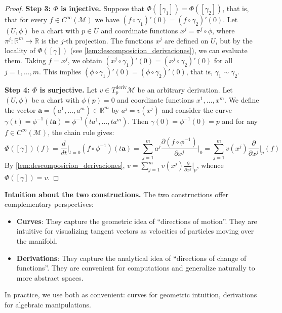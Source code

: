 \begin{proof}
\textbf{Step 3: $\Phi$ is injective.} Suppose that $\Phi([\gamma_1]) = \Phi([\gamma_2])$, that is, that for every $f \in C^\infty(\mathcal{M})$ we have $(f \circ \gamma_1)'(0) = (f \circ \gamma_2)'(0)$. Let $(U, \phi)$ be a chart with $p \in U$ and coordinate functions $x^j = \pi^j \circ \phi$, where $\pi^j: \mathbb{R}^m \to \mathbb{R}$ is the $j$-th projection. The functions $x^j$ are defined on $U$, but by the locality of $\Phi([\gamma])$ (see \autoref{lem:descomposicion_derivaciones}), we can evaluate them. Taking $f = x^j$, we obtain $(x^j \circ \gamma_1)'(0) = (x^j \circ \gamma_2)'(0)$ for all $j = 1, \ldots, m$. This implies $(\phi \circ \gamma_1)'(0) = (\phi \circ \gamma_2)'(0)$, that is, $\gamma_1 \sim \gamma_2$.

\textbf{Step 4: $\Phi$ is surjective.} Let $v \in T_p^{\text{deriv}}\mathcal{M}$ be an arbitrary derivation. Let $(U, \phi)$ be a chart with $\phi(p) = 0$ and coordinate functions $x^1, \ldots, x^m$. We define the vector $\mathbf{a} = (a^1, \ldots, a^m) \in \mathbb{R}^m$ by $a^j = v(x^j)$ and consider the curve $\gamma(t) = \phi^{-1}(t\mathbf{a}) = \phi^{-1}(ta^1, \ldots, ta^m)$. Then $\gamma(0) = \phi^{-1}(0) = p$ and for any $f \in C^\infty(\mathcal{M})$, the chain rule gives:
\[
\Phi([\gamma])(f) = \frac{d}{dt}\bigg|_{t=0} (f \circ \phi^{-1})(t\mathbf{a}) = \sum_{j=1}^{m} a^j \frac{\partial (f \circ \phi^{-1})}{\partial x^j}\bigg|_{0} = \sum_{j=1}^{m} v(x^j) \frac{\partial}{\partial x^j}\bigg|_p (f)
\]
By \autoref{lem:descomposicion_derivaciones}, $v = \sum_{j=1}^{m} v(x^j) \frac{\partial}{\partial x^j}\big|_p$, whence $\Phi([\gamma]) = v$.
\end{proof}

\textbf{Intuition about the two constructions.} The two constructions offer complementary perspectives:
\begin{itemize}
	\item \textbf{Curves}: They capture the geometric idea of ``directions of motion''. They are intuitive for visualizing tangent vectors as velocities of particles moving over the manifold.
	\item \textbf{Derivations}: They capture the analytical idea of ``directions of change of functions''. They are convenient for computations and generalize naturally to more abstract spaces.
\end{itemize}
In practice, we use both as convenient: curves for geometric intuition, derivations for algebraic manipulations.

